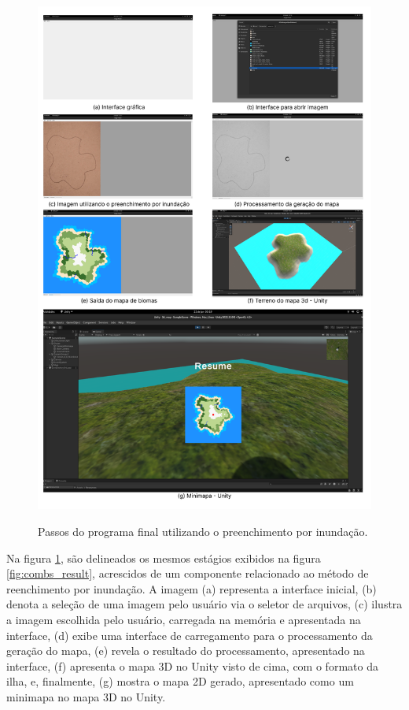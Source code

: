 \begin{figure}[!ht]
	\centering
    \caption{Passos do programa final utilizando o preenchimento por inundação.}
	\includegraphics[width=\textwidth]{figures/geracao_balde_tinta.png}
	\label{fig:combs_result_2}
\end{figure}

\pagebreak

Na figura \cref{fig:combs_result_2}, são delineados os mesmos estágios exibidos na figura \cref{fig:combs_result}, acrescidos de um componente relacionado ao método de reenchimento por inundação. A imagem (a) representa a interface inicial, (b) denota a seleção de uma imagem pelo usuário via o seletor de arquivos, (c) ilustra a imagem escolhida pelo usuário, carregada na memória e apresentada na interface, (d) exibe uma interface de carregamento para o processamento da geração do mapa, (e) revela o resultado do processamento, apresentado na interface, (f) apresenta o mapa 3D no Unity visto de cima, com o formato da ilha, e, finalmente, (g) mostra o mapa 2D gerado, apresentado como um minimapa no mapa 3D no Unity.